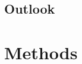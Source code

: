 \documentclass[fleqn,10pt]{wlscirep}
\newcommand{\mer}[1]{\textcolor{magenta}{#1}}
\newcommand{\draft}[1]{\textcolor{lightgray}{#1}}
\begin{document}

\subsection*{Outlook}


\draft{\lipsum[1]}

\section*{Methods}
\end{document}
